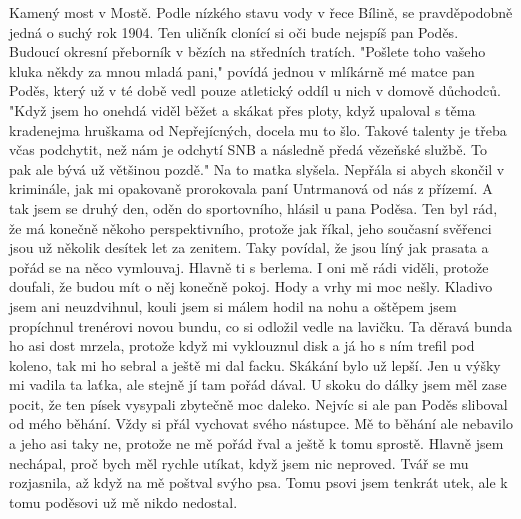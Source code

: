 
Kamený most v Mostě. Podle nízkého stavu vody v řece Bílině, se
pravděpodobně jedná o suchý rok 1904. Ten uličník clonící si oči bude
nejspíš pan Poděs. Budoucí okresní přeborník v bězích na středních
tratích. "Pošlete toho vašeho kluka někdy za mnou mladá pani," povídá
jednou v mlíkárně mé matce pan Poděs, který už v té době vedl pouze
atletický oddíl u nich v domově důchodců. "Když jsem ho onehdá viděl
běžet a skákat přes ploty, když upaloval s těma kradenejma hruškama od
Nepřejícných, docela mu to šlo. Takové talenty je třeba včas
podchytit, než nám je odchytí SNB a následně předá vězeňské službě. To
pak ale bývá už většinou pozdě." Na to matka slyšela. Nepřála si abych
skončil v kriminále, jak mi opakovaně prorokovala paní Untrmanová od
nás z přízemí. A tak jsem se druhý den, oděn do sportovního, hlásil u
pana Poděsa. Ten byl rád, že má konečně někoho perspektivního, protože
jak říkal, jeho současní svěřenci jsou už několik desítek let za
zenitem. Taky povídal, že jsou líný jak prasata a pořád se na něco
vymlouvaj. Hlavně ti s berlema. I oni mě rádi viděli, protože doufali,
že budou mít o něj konečně pokoj. Hody a vrhy mi moc nešly. Kladivo
jsem ani neuzdvihnul, kouli jsem si málem hodil na nohu a oštěpem jsem
propíchnul trenérovi novou bundu, co si odložil vedle na lavičku. Ta
děravá bunda ho asi dost mrzela, protože když mi vyklouznul disk a já
ho s ním trefil pod koleno, tak mi ho sebral a ještě mi dal facku.
Skákání bylo už lepší. Jen u výšky mi vadila ta laťka, ale stejně jí
tam pořád dával. U skoku do dálky jsem měl zase pocit, že ten písek
vysypali zbytečně moc daleko. Nejvíc si ale pan Poděs sliboval od mého
běhání. Vždy si přál vychovat svého nástupce. Mě to běhání ale
nebavilo a jeho asi taky ne, protože ne mě pořád řval a ještě k tomu
sprostě. Hlavně jsem nechápal, proč bych měl rychle utíkat, když jsem
nic neproved. Tvář se mu rozjasnila, až když na mě poštval svýho psa.
Tomu psovi jsem tenkrát utek, ale k tomu poděsovi už mě nikdo
nedostal.


